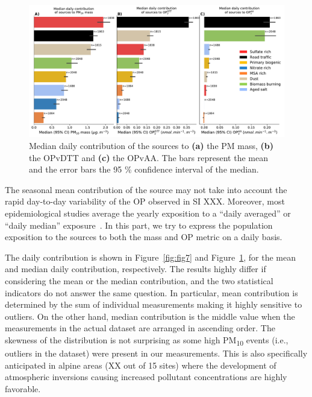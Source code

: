 \documentclass[acp]{copernicus}
\begin{document}
\begin{figure}[ht]
    \centering
    \includegraphics[width=1.0\linewidth]{figures/fig8}
    \caption{
        Median daily contribution of the sources to \textbf{(a)} the PM mass, \textbf{(b)} the
        OPvDTT and \textbf{(c)} the OPvAA. The bars represent the mean and the error bars
        the 95 \% confidence interval of the median. 
    }%
    \label{fig:fig8}
\end{figure}

The seasonal mean contribution of the source may not take into account
the rapid day-to-day variability of the OP observed in SI XXX. Moreover,
most epidemiological studies average the yearly exposition to a ``daily
averaged'' or ``daily median'' exposure~\citep{worldhealthorganizationAmbient2016}.
In this part, we try to express the population exposition to the
sources to both the mass and OP metric on a daily basis.

The daily contribution is shown in Figure~\ref{fig:fig7} and Figure~\ref{fig:fig8}, for
the mean and median daily contribution, respectively. The results highly differ if
considering the mean or the median contribution, and the two statistical indicators do not
answer the same question. In particular, mean contribution is determined by the sum of
individual measurements making it highly sensitive to outliers. On the other hand, median
contribution is the middle value when the measurements in the actual dataset are arranged
in ascending order. The skewness of the distribution is not surprising as some high
PM\textsubscript{10} events (i.e., outliers in the dataset) were present in our
measurements. This is also specifically anticipated in alpine areas (XX out of 15 sites)
where the development of atmospheric inversions causing increased pollutant concentrations
are highly favorable.
\end{document}
